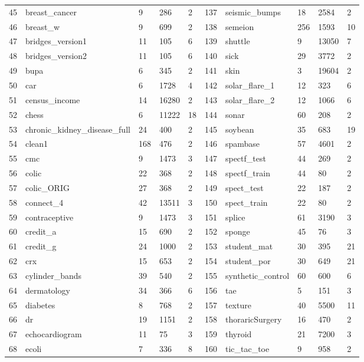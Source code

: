 \documentclass[review,3p]{elsarticle}
\begin{document}
\begin{longtable}{p{0.1cm}lp{0.8cm}<{\centering}p{0.8cm}<{\centering}p{0.9cm}<{\centering}|p{0.1cm}lp{0.8cm}<{\centering}p{0.8cm}<{\centering}p{0.9cm}<{\centering}}
			45	&	breast\_cancer	&	9	&	286	&	2	&	137	&	seismic\_bumps	&	18	&	2584	&	2	\\
			46	&	breast\_w	&	9	&	699	&	2	&	138	&	semeion	&	256	&	1593	&	10	\\
			47	&	bridges\_version1	&	11	&	105	&	6	&	139	&	shuttle	&	9	&	13050	&	7	\\
			48	&	bridges\_version2	&	11	&	105	&	6	&	140	&	sick	&	29	&	3772	&	2	\\
			49	&	bupa	&	6	&	345	&	2	&	141	&	skin	&	3	&	19604	&	2	\\
			50	&	car	&	6	&	1728	&	4	&	142	&	solar\_flare\_1	&	12	&	323	&	6	\\
			51	&	census\_income	&	14	&	16280	&	2	&	143	&	solar\_flare\_2	&	12	&	1066	&	6	\\
			52	&	chess	&	6	&	11222	&	18	&	144	&	sonar	&	60	&	208	&	2	\\
			53	&	chronic\_kidney\_disease\_full	&	24	&	400	&	2	&	145	&	soybean	&	35	&	683	&	19	\\
			54	&	clean1	&	168	&	476	&	2	&	146	&	spambase	&	57	&	4601	&	2	\\
			55	&	cmc	&	9	&	1473	&	3	&	147	&	spectf\_test	&	44	&	269	&	2	\\
			56	&	colic	&	22	&	368	&	2	&	148	&	spectf\_train	&	44	&	80	&	2	\\
			57	&	colic\_ORIG	&	27	&	368	&	2	&	149	&	spect\_test	&	22	&	187	&	2	\\
			58	&	connect\_4	&	42	&	13511	&	3	&	150	&	spect\_train	&	22	&	80	&	2	\\
			59	&	contraceptive	&	9	&	1473	&	3	&	151	&	splice	&	61	&	3190	&	3	\\
			60	&	credit\_a	&	15	&	690	&	2	&	152	&	sponge	&	45	&	76	&	3	\\
			61	&	credit\_g	&	24	&	1000	&	2	&	153	&	student\_mat	&	30	&	395	&	21	\\
			62	&	crx	&	15	&	653	&	2	&	154	&	student\_por	&	30	&	649	&	21	\\
			63	&	cylinder\_bands	&	39	&	540	&	2	&	155	&	synthetic\_control	&	60	&	600	&	6	\\
			64	&	dermatology	&	34	&	366	&	6	&	156	&	tae	&	5	&	151	&	3	\\
			65	&	diabetes	&	8	&	768	&	2	&	157	&	texture	&	40	&	5500	&	11	\\
			66	&	dr	&	19	&	1151	&	2	&	158	&	thoraricSurgery	&	16	&	470	&	2	\\
			67	&	echocardiogram	&	11	&	75	&	3	&	159	&	thyroid	&	21	&	7200	&	3	\\
			68	&	ecoli	&	7	&	336	&	8	&	160	&	tic\_tac\_toe	&	9	&	958	&	2	\\

\end{longtable}
\end{document}

